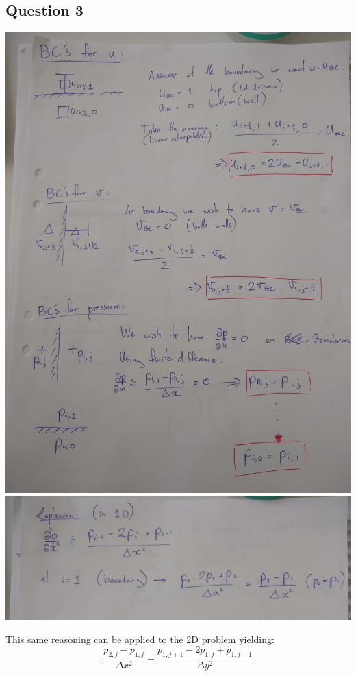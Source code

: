 \documentclass[10pt,a4paper]{article}
\begin{document}
\subsection{Question 3}
\includegraphics[width=\textwidth]{Q3A.jpg}
\noindent \includegraphics[width=\textwidth]{Q3B.jpg}

This same reasoning can be applied to the 2D problem yielding:
\begin{equation}
\frac{p_{2,j} - p_{1,j} }{\Delta x^2} + \frac{p_{1,j+1} - 2p_{1,j} + p_{1,j-1}}{\Delta y^2}
\end{equation}
\end{document}
